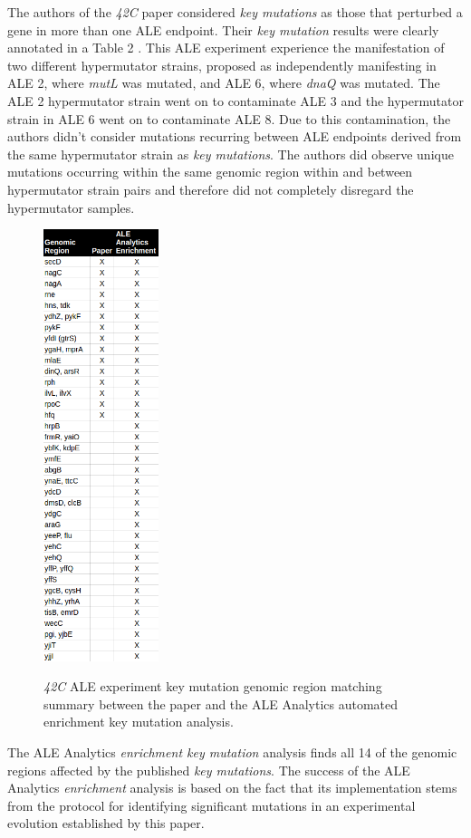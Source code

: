 \documentclass[12pt,final,masters,chapterheads]{ucsd}  %
\begin{document}
The authors of the \textit{42C} paper considered \textit{key mutations} as those that perturbed a gene in more than one ALE endpoint. Their \textit{key mutation} results were clearly annotated in a Table 2 \cite{pmid25015645}. This ALE experiment experience the manifestation of two different hypermutator strains, proposed as independently manifesting in ALE 2, where \textit{mutL} was mutated, and ALE 6, where \textit{dnaQ} was mutated. The ALE 2 hypermutator strain went on to contaminate ALE 3 and the hypermutator strain in ALE 6 went on to contaminate ALE 8. Due to this contamination, the authors didn't consider mutations recurring between ALE endpoints derived from the same hypermutator strain as \textit{key mutations}. The authors did observe unique mutations occurring within the same genomic region within and between hypermutator strain pairs and therefore did not completely disregard the hypermutator samples.
\begin{figure}[H]
  \caption{\textit{42C} ALE experiment {key mutation} genomic region matching summary between the paper and the ALE Analytics automated {enrichment key mutation} analysis.}
  \centering
  \includegraphics[width=0.3\textwidth]{42c_key_mutation_regions.png}
  \label{fig:42c_key_mutation_regions}
\end{figure}
The ALE Analytics \textit{enrichment key mutation} analysis finds all 14 of the genomic regions affected by the published \textit{key mutations}. The success of the ALE Analytics \textit{enrichment} analysis is based on the fact that its implementation stems from the protocol for identifying significant mutations in an experimental evolution established by this paper.
\end{document}
